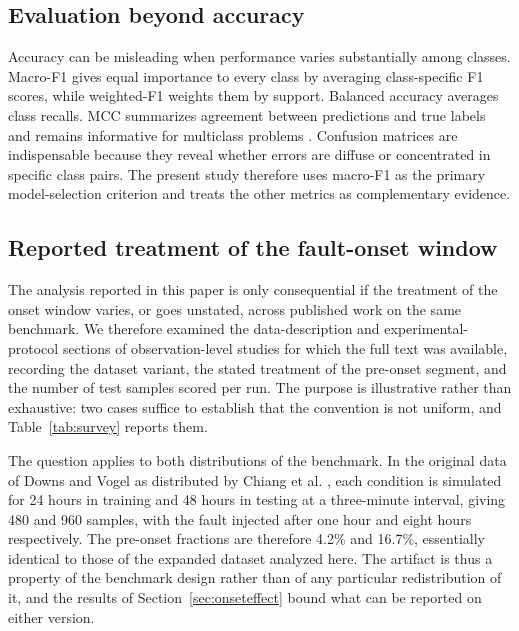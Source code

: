 \documentclass[12pt,a4paper]{article}
\begin{document}
\subsection{Evaluation beyond accuracy}

Accuracy can be misleading when performance varies substantially among classes.
Macro-F1 gives equal importance to every class by averaging class-specific F1
scores, while weighted-F1 weights them by support. Balanced accuracy averages
class recalls. MCC summarizes agreement between predictions and true labels and
remains informative for multiclass problems \cite{matthews1975mcc}. Confusion
matrices are indispensable because they reveal whether errors are diffuse or
concentrated in specific class pairs. The present study therefore uses
macro-F1 as the primary model-selection criterion and treats the other metrics
as complementary evidence.

\subsection{Reported treatment of the fault-onset window}
\label{sec:survey}

The analysis reported in this paper is only consequential if the treatment of
the onset window varies, or goes unstated, across published work on the same
benchmark. We therefore examined the data-description and experimental-protocol
sections of observation-level studies for which the full text was available,
recording the dataset variant, the stated treatment of the pre-onset segment,
and the number of test samples scored per run. The purpose is illustrative
rather than exhaustive: two cases suffice to establish that the convention is
not uniform, and Table~\ref{tab:survey} reports them.

The question applies to both distributions of the benchmark. In the original
data of Downs and Vogel as distributed by Chiang et al.
\cite{downs1993tep,chiang2001book}, each condition is simulated for 24 hours in
training and 48 hours in testing at a three-minute interval, giving 480 and 960
samples, with the fault injected after one hour and eight hours respectively.
The pre-onset fractions are therefore 4.2\% and 16.7\%, essentially identical
to those of the expanded dataset analyzed here. The artifact is thus a property
of the benchmark design rather than of any particular redistribution of it,
and the results of Section~\ref{sec:onseteffect} bound what can be reported on
either version.
\end{document}
